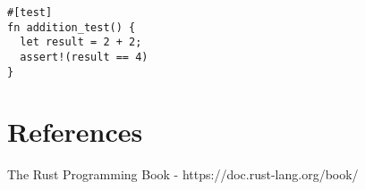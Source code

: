 \documentclass[letterpaper,landscape]{article}
\begin{document}
\begin{multicols}{3}
\begin{verbatim}
#[test]
fn addition_test() {
  let result = 2 + 2;
  assert!(result == 4)
}
\end{verbatim}

\section*{References}

The Rust Programming Book - https://doc.rust-lang.org/book/

\end{multicols}
\end{document}
